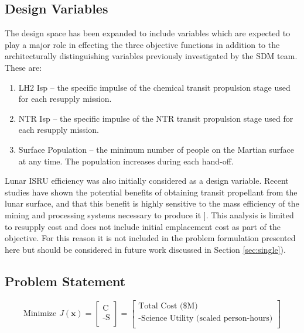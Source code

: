 \documentclass[]{aiaa-pretty}
\begin{document}
\subsection{Design Variables}
\label{sec:DVs}
The design space has been expanded to include variables which are expected to play a major role in effecting the three objective functions in addition to the architecturally distinguishing variables previously investigated by the SDM team. These are:
\begin{enumerate}
\item	LH2 Isp – the specific impulse of the chemical transit propulsion stage used for each resupply mission.
\item NTR Isp – the specific impulse of the NTR transit propulsion stage used for each resupply mission.
\item	Surface Population – the minimum number of people on the Martian surface at any time. The population increases during each hand-off.
\end{enumerate} 
Lunar ISRU efficiency was also initially considered as a design variable. Recent studies have shown the potential benefits of obtaining transit propellant from the lunar surface, and that this benefit is highly sensitive to the mass efficiency of the mining and processing systems necessary to produce it \cite{ho2014dynamic}]. This analysis is limited to resupply cost and does not include initial emplacement cost as part of the objective. For this reason it is not included in the problem formulation presented here but should be considered in future work discussed in Section \ref{sec:single}). 

\subsection{Problem Statement}
\begin{equation*}
\mbox{Minimize } J(\mathbf{x})
=
\begin{bmatrix}
\mbox{C}\\
\mbox{-S}\\
\end{bmatrix}
=
\begin{bmatrix}
\mbox{Total Cost (\$M)}\\
\mbox{-Science Utility (scaled person-hours)}\\
\end{bmatrix}
\end{equation*}
\end{document}
